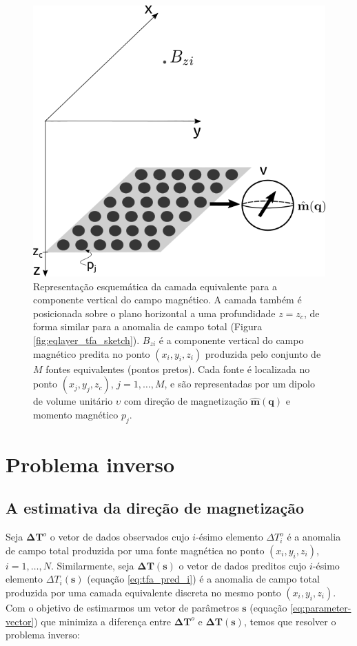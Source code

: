\begin{figure}[H]
	\centering
	\includegraphics[width=.7\textwidth]{Fig/mag_vec/eqlayer_figure_bz.png}
	\caption{Representação esquemática da camada equivalente para a componente vertical do campo magnético. A camada também é posicionada sobre o plano horizontal a uma profundidade $z=z_c$, de forma similar para a anomalia de campo total (Figura \ref{fig:eqlayer_tfa_sketch}). $B_{zi}$ é a componente vertical do campo magnético predita no ponto $(x_i,y_i,z_i)$ produzida pelo conjunto de $M$ fontes equivalentes (pontos pretos). Cada fonte é localizada no ponto  $(x_j,y_j,z_c)$, $j = 1,\hdots, M$, e são representadas por um dipolo de volume unitário $\upsilon$ com direção de magnetização $\hat{\mathbf{m}}(\mathbf{q})$ e momento magnético $p_j$.}
	\label{fig:eqlayer_bz_sketch}
\end{figure}


\section{Problema inverso}

\subsection{A estimativa da direção de magnetização}
\label{subsec:mag_dir_est}

Seja $\mathbf{\Delta T}^{o}$ o vetor de dados observados cujo $i$-ésimo elemento $\Delta T_{i}^{o}$ é a anomalia de campo total produzida por uma fonte magnética no ponto $(x_{i},y_{i},z_{i})$, $i = 1, \dots, N$. Similarmente, seja $\mathbf{\Delta T} (\mathbf{s})$ o vetor de dados preditos cujo $i$-ésimo elemento $\Delta T_{i}(\mathbf{s})$ (equação \ref{eq:tfa_pred_i}) é a anomalia de campo total produzida por uma camada equivalente discreta no mesmo ponto $(x_{i},y_{i},z_{i})$. Com o objetivo de estimarmos um vetor de parâmetros $\mathbf{s}$ (equação \ref{eq:parameter-vector}) que minimiza a diferença entre $\mathbf{\Delta T}^{o}$ e $\mathbf{\Delta T}(\mathbf{s})$, temos que resolver o problema inverso:

